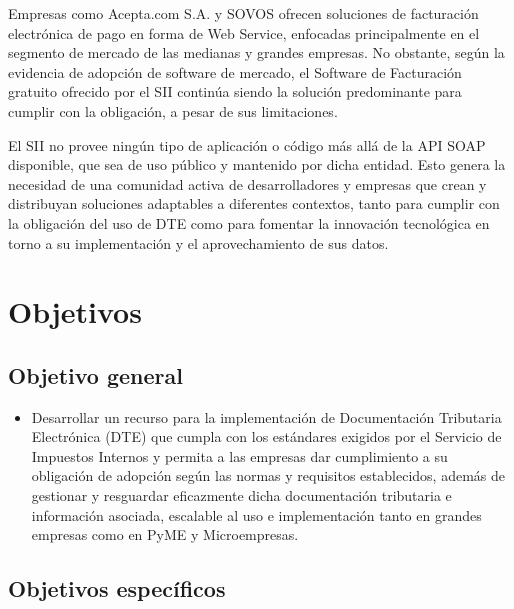 Empresas como Acepta.com S.A. y SOVOS ofrecen soluciones de facturación electrónica de pago en forma de Web Service, enfocadas principalmente en el segmento de mercado de las medianas y grandes empresas. No obstante, según la evidencia de adopción de software de mercado, el Software de Facturación gratuito ofrecido por el SII continúa siendo la solución predominante para cumplir con la obligación, a pesar de sus limitaciones.

El SII no provee ningún tipo de aplicación o código más allá de la API SOAP disponible, que sea de uso público y mantenido por dicha entidad. Esto genera la necesidad de una comunidad activa de desarrolladores y empresas que crean y distribuyan soluciones adaptables a diferentes contextos, tanto para cumplir con la obligación del uso de DTE como para fomentar la innovación tecnológica en torno a su implementación y el aprovechamiento de sus datos.

\section{Objetivos}

\subsection{Objetivo general}

\begin{itemize} 
    \item Desarrollar un recurso para la implementación de Documentación Tributaria Electrónica (DTE) que cumpla con los estándares exigidos por el Servicio de Impuestos Internos y permita a las empresas dar cumplimiento a su obligación de adopción según las normas y requisitos establecidos, además de gestionar y resguardar eficazmente dicha documentación tributaria e información asociada, escalable al uso e implementación tanto en grandes empresas como en PyME y Microempresas.
\end{itemize}

\subsection{Objetivos específicos}

